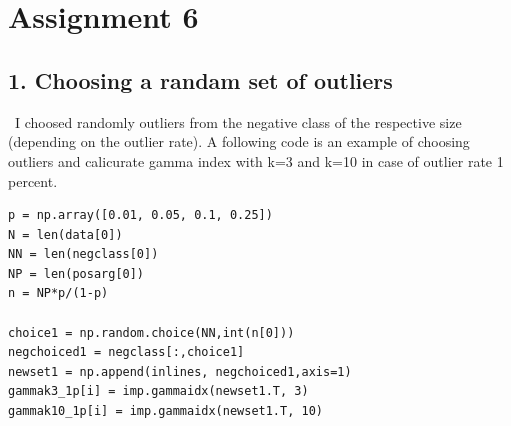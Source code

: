 \documentclass[a4paper,11pt]{article}
\begin{document}
\begin{verbatim}








\end{verbatim}
  
  
  
\section*{Assignment 6}
\subsection*{1. Choosing a randam set of outliers}
\ I choosed randomly outliers from the negative class of the respective size (depending on the
outlier rate). A following code is an example of choosing outliers and calicurate gamma index with k=3 and k=10 in case of outlier rate 1 percent.

\begin{verbatim}
p = np.array([0.01, 0.05, 0.1, 0.25])
N = len(data[0])
NN = len(negclass[0])
NP = len(posarg[0])
n = NP*p/(1-p)

choice1 = np.random.choice(NN,int(n[0]))
negchoiced1 = negclass[:,choice1]
newset1 = np.append(inlines, negchoiced1,axis=1)
gammak3_1p[i] = imp.gammaidx(newset1.T, 3)
gammak10_1p[i] = imp.gammaidx(newset1.T, 10)
\end{verbatim}
\end{document}

